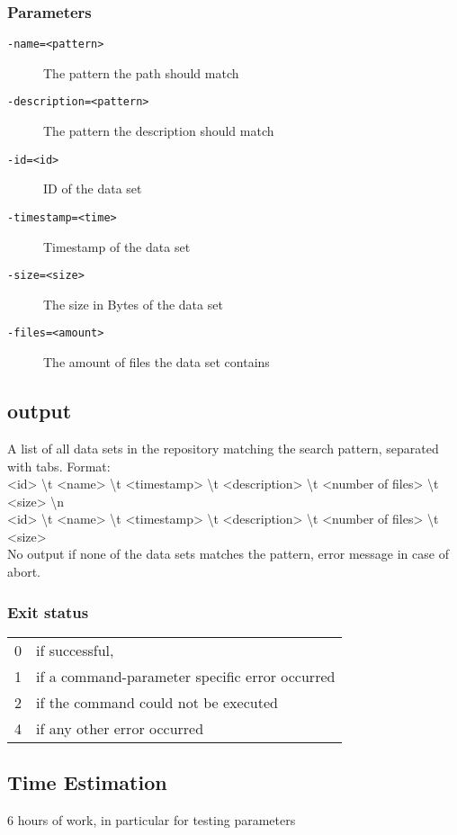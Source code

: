 \documentclass{article} %
\begin{document}
		\subsubsection*{Parameters}
		\begin{description}
			\item[\texttt{-name=<pattern>}] The pattern the path should match
			\item[\texttt{-description=<pattern>}] The pattern the description should match
			\item[\texttt{-id=<id>}] ID of the data set
			\item[\texttt{-timestamp=<time>}] Timestamp of the data set
			\item[\texttt{-size=<size>}] The size in Bytes of the data set
			\item[\texttt{-files=<amount>}] The amount of files the data set contains
		\end{description}
		\subsection*{output}
		A list of all data sets in the repository matching the search pattern, separated with tabs. Format:\\<id> \textbackslash t <name> \textbackslash t <timestamp> \textbackslash t <description> \textbackslash t <number of files> \textbackslash t <size> \textbackslash n \\<id> \textbackslash t <name> \textbackslash t <timestamp> \textbackslash t <description> \textbackslash t <number of files> \textbackslash t <size>\\
		No output if none of the data sets matches the pattern, error message in case of abort.
		\subsubsection*{Exit status}
		\begin{tabular}{ll}
			0 &  if successful,\\ 
			1 &  if a command-parameter specific error occurred\\
			2 &  if the command could not be executed\\
			4 &  if any other error occurred\\
		\end{tabular}
				\subsection*{Time Estimation}
				6 hours of work, in particular for testing parameters\\
				\noindent
		\newpage
\end{document}
